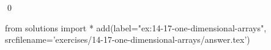 
\begin{ex}
  \label{ex:14-17-one-dimensional-arrays}
  
  \qed
\end{ex}
\begin{python0}
from solutions import *
add(label="ex:14-17-one-dimensional-arrays",
    srcfilename='exercises/14-17-one-dimensional-arrays/answer.tex')
\end{python0}
